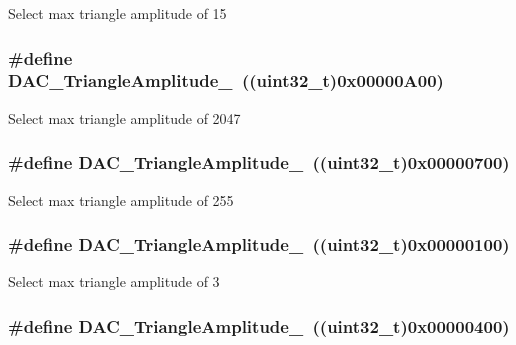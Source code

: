 \label{group__DAC__lfsrunmask__triangleamplitude_ga42653712ce783d33ecb2f3e97e9c2ece}
Select max triangle amplitude of 15 \hypertarget{group__DAC__lfsrunmask__triangleamplitude_gad33d28d7fcc09d84500ea9b6e6c5feed}{
\subsubsection[{DAC\_\-TriangleAmplitude\_\-2047}]{\setlength{\rightskip}{0pt plus 5cm}\#define DAC\_\-TriangleAmplitude\_~((uint32\_\-t)0x00000A00)}}
\label{group__DAC__lfsrunmask__triangleamplitude_gad33d28d7fcc09d84500ea9b6e6c5feed}
Select max triangle amplitude of 2047 \hypertarget{group__DAC__lfsrunmask__triangleamplitude_gadb404422c86a7b92d78e6d9617e8ce4d}{
\subsubsection[{DAC\_\-TriangleAmplitude\_\-255}]{\setlength{\rightskip}{0pt plus 5cm}\#define DAC\_\-TriangleAmplitude\_~((uint32\_\-t)0x00000700)}}
\label{group__DAC__lfsrunmask__triangleamplitude_gadb404422c86a7b92d78e6d9617e8ce4d}
Select max triangle amplitude of 255 \hypertarget{group__DAC__lfsrunmask__triangleamplitude_ga9798d68c3bbf0a57306bf2f962697377}{
\subsubsection[{DAC\_\-TriangleAmplitude\_\-3}]{\setlength{\rightskip}{0pt plus 5cm}\#define DAC\_\-TriangleAmplitude\_~((uint32\_\-t)0x00000100)}}
\label{group__DAC__lfsrunmask__triangleamplitude_ga9798d68c3bbf0a57306bf2f962697377}
Select max triangle amplitude of 3 \hypertarget{group__DAC__lfsrunmask__triangleamplitude_ga10b15745b749c62a56bd3d7bd5a27e1b}{
\subsubsection[{DAC\_\-TriangleAmplitude\_\-31}]{\setlength{\rightskip}{0pt plus 5cm}\#define DAC\_\-TriangleAmplitude\_~((uint32\_\-t)0x00000400)}}
